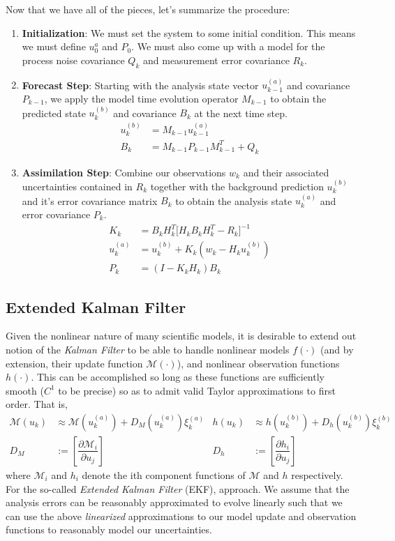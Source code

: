 Now that we have all of the pieces, let's summarize the procedure:
\begin{enumerate}
\item \textbf{Initialization}: We must set the system to some initial condition. This means we must define $u_0^a$ and $P_0$. We must also come up with a model for the process noise covariance $Q_k$ and measurement error covariance $R_k$.
\item \textbf{Forecast Step}: Starting with the analysis state vector $u^{(a)}_{k-1}$ and covariance $P_{k-1}$, we apply the model time evolution operator $M_{k-1}$ to obtain the predicted state $u^{(b)}_{k}$ and covariance $B_k$ at the next time step.
  \begin{align}
    u_k^{(b)} &= M_{k-1}u_{k-1}^{(a)} \\
    B_k &= M_{k-1}P_{k-1}M_{k-1}^T + Q_{k}
  \end{align}
\item \textbf{Assimilation Step}: Combine our observations $w_k$ and their associated uncertainties contained in $R_k$ together with the background prediction $u^{(b)}_k$ and it's error covariance matrix $B_k$ to obtain the analysis state $u^{(a)}_k$ and error covariance $P_k$.
  \begin{align}
    K_k &= B_kH_k^T\Big[ H_kB_kH_k^T - R_k \Big]^{-1}  \\
    u_k^{(a)} &= u_k^{(b)} + K_k(w_k - H_ku_k^{(b)})\\
    P_k &= \left(I - K_kH_k \right)B_k
  \end{align}
\end{enumerate}


\subsection{Extended Kalman Filter}

Given the nonlinear nature of many scientific models, it is desirable to extend out notion of the \textit{Kalman Filter} to be able to handle nonlinear models $f(\cdot)$ (and by extension, their update function $\mathcal{M}(\cdot)$), and nonlinear observation functions $h(\cdot)$. This can be accomplished so long as these functions are sufficiently smooth ($C^1$ to be precise) so as to admit valid Taylor approximations to first order. That is,
\begin{align}
    \mathcal{M}(u_{k}) &\approx \mathcal{M}(u_k^{(a)}) + D_{M}(u_k^{(a)})\xi_k^{(a)} & h(u_k) &\approx h(u_k^{(b)}) + D_h(u_k^{(b)})\xi_k^{(b)} \\
    D_{M} &:= \left[\dfrac{\partial \mathcal{M}_i}{\partial u_j} \right] & D_h &:= \left[ \dfrac{\partial h_i}{\partial u_j}\right]
\end{align}
where $\mathcal{M}_i$ and $h_i$  denote the ith component functions of $\mathcal{M}$ and $h$ respectively. For the so-called \textit{Extended Kalman Filter} (EKF), approach. We assume that the analysis errors can be reasonably approximated to evolve linearly such that we can use the above \textit{linearized} approximations to our model update and observation functions to reasonably model our uncertainties.

